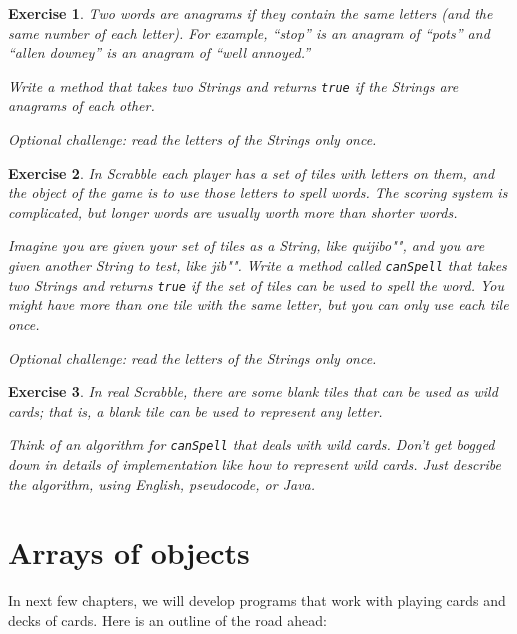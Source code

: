 \documentclass[12pt]{book}
\theoremstyle{exercise}
\newtheorem{exercise}{Exercise}[chapter]
\newcommand{\java}[1]{\verb"#1"}
\newcommand{\java}[1]{\lstinline{#1}} %
\begin{document}
\begin{exercise}
Two words are anagrams if they contain the same letters (and the same number of each letter).
For example, ``stop'' is an anagram of ``pots'' and ``allen downey'' is an anagram of ``well annoyed.''

Write a method that takes two Strings and returns \java{true} if the Strings are anagrams of each other.

Optional challenge: read the letters of the Strings only once.
\end{exercise}


\begin{exercise}
In Scrabble each player has a set of tiles with letters on them, and the object of the game is to use those letters to spell words.
The scoring system is complicated, but longer words are usually worth more than shorter words.

Imagine you are given your set of tiles as a String, like \java{"quijibo"}, and you are given another String to test, like \java{"jib"}.
Write a method called \java{canSpell} that takes two Strings and returns \java{true} if the set of tiles can be used to spell the word.
You might have more than one tile with the same letter, but you can only use each tile once.

Optional challenge: read the letters of the Strings only once.
\end{exercise}


\begin{exercise}
In real Scrabble, there are some blank tiles that can be used as wild cards; that is, a blank tile can be used to represent any letter.

Think of an algorithm for \java{canSpell} that deals with wild cards.
Don't get bogged down in details of implementation like how to represent wild cards.
Just describe the algorithm, using English, pseudocode, or Java.
\end{exercise}


\chapter{Arrays of objects}

In next few chapters, we will develop programs that work with playing cards and decks of cards.
Here is an outline of the road ahead:
\end{document}
